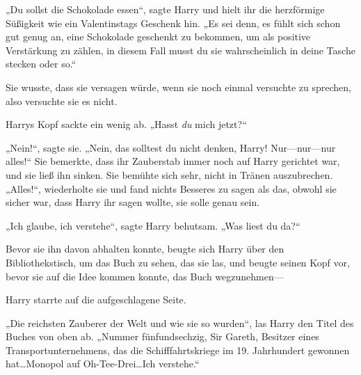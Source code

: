 „Du sollst die Schokolade essen“, sagte Harry und hielt ihr die herzförmige Süßigkeit wie ein Valentinstags Geschenk hin. „Es sei denn, es fühlt sich schon gut genug an, eine Schokolade geschenkt zu bekommen, um als positive Verstärkung zu zählen, in diesem Fall musst du sie wahrscheinlich in deine Tasche stecken oder so.“

Sie wusste, dass sie versagen würde, wenn sie noch einmal versuchte zu sprechen, also versuchte sie es nicht.

Harrys Kopf sackte ein wenig ab. „Hasst \emph{du} mich jetzt?“

„Nein!“, sagte sie. „Nein, das solltest du nicht denken, Harry! Nur—nur—nur alles!“
Sie bemerkte, dass ihr Zauberstab immer noch auf Harry gerichtet war, und sie ließ ihn sinken. Sie bemühte sich sehr, nicht in Tränen auszubrechen.
„Alles!“, wiederholte sie und fand nichts Besseres zu sagen als das, obwohl sie sicher war, dass Harry ihr sagen wollte, sie solle genau sein.

„Ich glaube, ich verstehe“, sagte Harry behutsam. „Was liest du da?“

Bevor sie ihn davon abhalten konnte, beugte sich Harry über den Bibliothekstisch, um das Buch zu sehen, das sie las, und beugte seinen Kopf vor, bevor sie auf die Idee kommen konnte, das Buch wegzunehmen—

Harry starrte auf die aufgeschlagene Seite.

„Die reichsten Zauberer der Welt und wie sie so wurden“, las Harry den Titel des Buches von oben ab. „Nummer fünfundsechzig, Sir Gareth, Besitzer eines Transportunternehmens, das die Schifffahrtskriege im 19. Jahrhundert gewonnen hat…Monopol auf Oh-Tee-Drei…Ich verstehe.“

